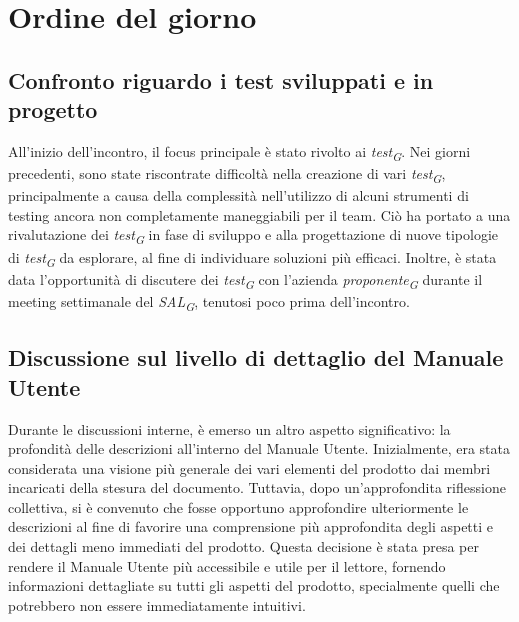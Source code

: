 \documentclass{article}
\begin{document}
\section{Ordine del giorno}
    \subsection{Confronto riguardo i test sviluppati e in progetto}
    All'inizio dell'incontro, il focus principale è stato rivolto ai \textit{test}\textsubscript{\textit{G}}. Nei giorni precedenti, sono state riscontrate difficoltà nella creazione di vari \textit{test}\textsubscript{\textit{G}}, principalmente a causa della complessità nell'utilizzo di alcuni strumenti di testing ancora non completamente maneggiabili per il team. Ciò ha portato a una rivalutazione dei \textit{test}\textsubscript{\textit{G}} in fase di sviluppo e alla progettazione di nuove tipologie di \textit{test}\textsubscript{\textit{G}} da esplorare, al fine di individuare soluzioni più efficaci. Inoltre, è stata data l'opportunità di discutere dei \textit{test}\textsubscript{\textit{G}} con l'azienda \textit{proponente}\textsubscript{\textit{G}} durante il meeting settimanale del \textit{SAL}\textsubscript{\textit{G}}, tenutosi poco prima dell'incontro.
    \subsection{Discussione sul livello di dettaglio del Manuale Utente}
    Durante le discussioni interne, è emerso un altro aspetto significativo: la profondità delle descrizioni all'interno del Manuale Utente. Inizialmente, era stata considerata una visione più generale dei vari elementi del prodotto dai membri incaricati della stesura del documento. Tuttavia, dopo un'approfondita riflessione collettiva, si è convenuto che fosse opportuno approfondire ulteriormente le descrizioni al fine di favorire una comprensione più approfondita degli aspetti e dei dettagli meno immediati del prodotto. Questa decisione è stata presa per rendere il Manuale Utente più accessibile e utile per il lettore, fornendo informazioni dettagliate su tutti gli aspetti del prodotto, specialmente quelli che potrebbero non essere immediatamente intuitivi.
\end{document}
